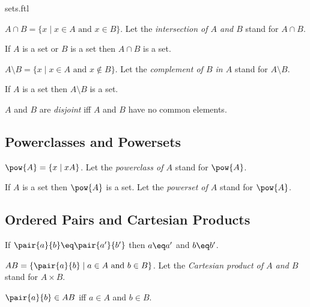 \documentclass{article}
\begin{document}
\begin{smodule}{sets.ftl}
\begin{definition*}[forthel,id=IntersectionDef,printid]
  $A\cap B=\{x\mid x\in A\text{ and }x\in B\}$.
  Let the \emph{intersection of $A$ and $B$} stand for $A\cap B$.
\end{definition*}

\begin{proposition*}[forthel,id=IntersectionProp,printid]
  If $A$ is a set or $B$ is a set then $A\cap B$ is a set.
\end{proposition*}

\begin{definition*}[forthel,id=ComplementDef,printid]
  $A\setminus B=\{x\mid x\in A\text{ and }x\notin B\}$.
  Let the \emph{complement of $B$ in $A$} stand for $A\setminus B$.
\end{definition*}

\begin{proposition*}[forthel,id=ComplementProp,printid]
  If $A$ is a set then $A\setminus B$ is a set.
\end{proposition*}

\begin{definition*}[forthel,id=DisjointDef,printid]
  $A$ and $B$ are \emph{disjoint} iff $A$ and $B$ have no common elements.
\end{definition*}


\subsection{Powerclasses and Powersets}

\begin{definition*}[forthel,id=PowerclassDef,printid]
  $\pow{A}=\{x\mid x\subseteq A\}$.
  Let the \emph{powerclass of $A$} stand for $\pow{A}$.
\end{definition*}

\begin{axiom*}[forthel,title=Powerset Axiom,id=PowersetAx,printid]
  If $A$ is a set then $\pow{A}$ is a set.
  Let the \emph{powerset of $A$} stand for $\pow{A}$.
\end{axiom*}


\subsection{Ordered Pairs and Cartesian Products}

\begin{axiom*}[forthel,title=Pair Extensionality Axiom,id=PairExtensionalityAx,printid]
  If $\pair{a}{b}\eq \pair{a'}{b'}$ then $a\eq a'$ and $b\eq b'$.
\end{axiom*}

\begin{definition*}[forthel,id=CartesianProductDef,printid]
  $A\times B=\{\pair{a}{b}\mid a\in A\text{ and }b\in B\}$.
  Let the \emph{Cartesian product of $A$ and $B$} stand for $A\times B$.
\end{definition*}

\begin{proposition*}[forthel,id=CartesianProductProp,printid]
  $\pair{a}{b}\in A\times B$ iff $a\in A$ and $b\in B$.
\end{proposition*}
\end{smodule}
\end{document}
